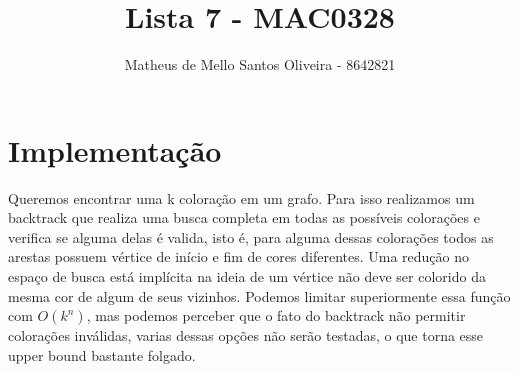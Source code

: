 \documentclass[a4paper]{article}
\title{Lista 7 - MAC0328} %
\author{Matheus de Mello Santos Oliveira - 8642821} %
\date{} %
\theoremstyle{style}
\theoremstyle{proof}
\begin{document}
\maketitle %


\section{Implementação}
Queremos encontrar uma k coloração em um grafo. Para isso realizamos um
backtrack que realiza uma busca completa em todas as possíveis colorações
e verifica se alguma delas é valida, isto é, para alguma dessas colorações
todos as arestas possuem vértice de início e fim de cores diferentes.
Uma redução no espaço de busca está implícita na ideia de um vértice não 
deve ser colorido da mesma cor de algum de seus vizinhos. Podemos limitar
superiormente essa função com $O(k^n)$, mas podemos perceber que o fato do
backtrack não permitir colorações inválidas, varias dessas opções não serão
testadas, o que torna esse upper bound bastante folgado.
\end{document}
